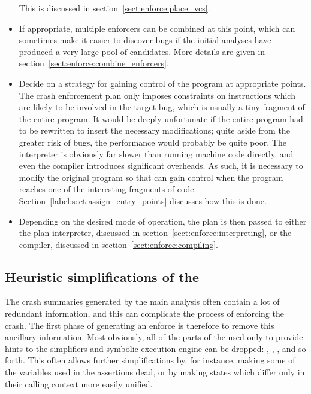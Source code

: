 \begin{itemize}
  This is discussed in section~\ref{sect:enforce:place_vcs}.
\item
  If appropriate, multiple enforcers can be combined at this point,
  which can sometimes make it easier to discover bugs if the initial
  analyses have produced a very large pool of candidates.  More
  details are given in section~\ref{sect:enforce:combine_enforcers}.
\item
  Decide on a strategy for gaining control of the program at
  appropriate points.  The crash enforcement plan only imposes
  constraints on instructions which are likely to be involved in the
  target bug, which is usually a tiny fragment of the entire program.
  It would be deeply unfortunate if the entire program had to be
  rewritten to insert the necessary modifications; quite aside from
  the greater risk of bugs, the performance would probably be quite
  poor.  The interpreter is obviously far slower than running machine
  code directly, and even the compiler introduces significant
  overheads.  As such, it is necessary to modify the original program
  so that {\technique} can gain control when the program reaches one
  of the interesting fragments of code.
  Section~\ref{label:sect:assign_entry_points} discusses how this is
  done.

\item
  Depending on the desired mode of operation, the plan is then passed
  to either the plan interpreter, discussed in
  section~\ref{sect:enforce:interpreting}, or the compiler, discussed
  in section~\ref{sect:enforce:compiling}.
\end{itemize}

\subsection{Heuristic simplifications of the {\StateMachines} }
\label{sect:enforce:heuristic_simplify}


The crash summaries generated by the main analysis often contain a lot
of redundant information, and this can complicate the process of
enforcing the crash.  The first phase of generating an enforce is
therefore to remove this ancillary information.  Most obviously, all
of the parts of the {\StateMachines} used only to provide hints to the
simplifiers and symbolic execution engine can be dropped:
, , , and so forth.
This often allows further simplifications by, for instance, making
some of the variables used in the assertions dead, or by making states
which differ only in their calling context more easily unified.

